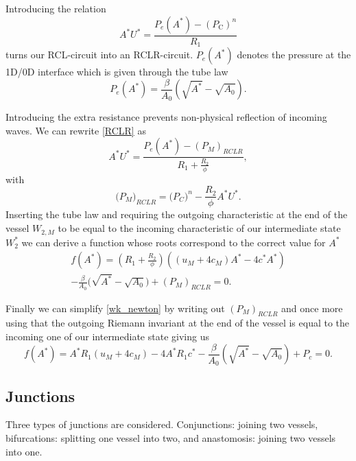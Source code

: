 \documentclass[a4paper, oneside]{discothesis}
\begin{document}
Introducing the relation
\begin{equation}
	A^{*}U^{*}={\frac{P_e(A^{*})-(P_{\mathrm{C}})^{n}}{R_{1}}} \label{RCLR}
\end{equation}
turns our RCL-circuit into an RCLR-circuit.
$P_e(A^*)$ denotes the pressure at the 1D/0D interface which is given through the tube law
\begin{equation}
	P_{e}(A^*)={\frac{\beta}{A_{0}}}\left({\sqrt{A^{*}}}-{\sqrt{A_{0}}}\right).
\end{equation}

Introducing the extra resistance prevents non-physical reflection of incoming waves.
We can rewrite \ref{RCLR} as 
\begin{equation}
	A^{*}U^{*}={\frac{P_e(A^{*})-(P_{M})_{R C L R}}{R_{1}+{\frac{R_{2}}{\phi}}}}, 
\end{equation}
with 
\begin{equation}
	\bigl(P_{M}\bigr)_{RCLR}=\bigl(P_{C}\bigr)^{n}-{\frac{R_{2}}{\phi}}A^{\ast}U^{\ast}.
\end{equation}
Inserting the tube law and requiring the outgoing characteristic at the end of the vessel $W_{2,M}$ to be equal to the incoming characteristic of our intermediate state $W_2^*$ we can derive a function whose roots correspond to the correct value for $A^*$
\begin{multline}
	f(A^{*}) = \left(R_{1}+{\frac{R_{2}}{\phi}}\right)\left( \left(u_{M}+4c_{M} \right)A^{*}-4c^*A^{*} \right) \\
	-{\frac{\beta}{A_{0}}}\Big(\sqrt{A^{*}}-\sqrt{A_{0}}\Big)+(P_{M})_{R C L R} =0. \label{wk_newton}
\end{multline}

Finally we can simplify \ref{wk_newton} by writing out $(P_{M})_{RCLR}$ and once more using that the outgoing Riemann invariant at the end of the vessel is equal to the incoming one of our intermediate state giving us
\begin{equation}
	f\left(A^*\right)=A^* R_1\left(u_M+4 c_M\right)-4 A^* R_1 c^*-\frac{\beta}{A_0}\left(\sqrt{A^*}-\sqrt{A_0}\right)+P_c = 0. \label{wk_eq3}
\end{equation}


\subsection{Junctions}
Three types of junctions are considered.
Conjunctions: joining two vessels, bifurcations: splitting one vessel into two, and anastomosis: joining two vessels into one.
\end{document}
